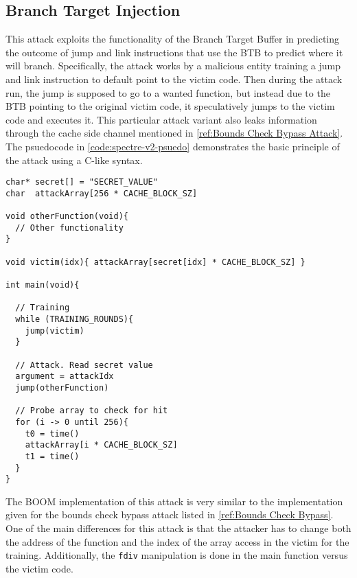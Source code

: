 \subsection{Branch Target Injection}

This attack exploits the functionality of the Branch Target Buffer in predicting the outcome
of jump and link instructions that use the BTB to predict where it will branch. Specifically, 
the attack works by a malicious entity training a jump and link instruction to default point to 
the victim code. Then during the attack run, the jump is supposed to go to a wanted function,
but instead due to the BTB pointing to the original victim code, it speculatively jumps to the
victim code and executes it. This particular attack variant also leaks information through the
cache side channel mentioned in \ref{ref:Bounds Check Bypass Attack}. The psuedocode in 
\ref{code:spectre-v2-psuedo} demonstrates the basic principle of the attack using a C-like syntax.

\begin{lstlisting}[style=column-code, caption=Psuedocode of Bounds Check Bypass Attack]
char* secret[] = "SECRET_VALUE"
char  attackArray[256 * CACHE_BLOCK_SZ]

void otherFunction(void){
  // Other functionality    
}

void victim(idx){ attackArray[secret[idx] * CACHE_BLOCK_SZ] }

int main(void){
  
  // Training
  while (TRAINING_ROUNDS){
    jump(victim)
  }

  // Attack. Read secret value
  argument = attackIdx
  jump(otherFunction)

  // Probe array to check for hit
  for (i -> 0 until 256){
    t0 = time()
    attackArray[i * CACHE_BLOCK_SZ]
    t1 = time()
  }
}
\end{lstlisting}\label{code:spectre-v2-pseudo}

The BOOM implementation of this attack is very similar to the implementation given for
the bounds check bypass attack listed in \ref{ref:Bounds Check Bypass}. One of the main differences
for this attack is that the attacker has to change both the address of the function and the
index of the array access in the victim for the training. Additionally, the {\tt fdiv} manipulation is 
done in the main function versus the victim code.
